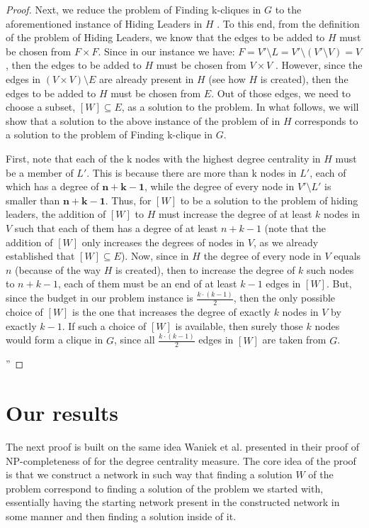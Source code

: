 \begin{proof}
{    Next, we reduce the problem of Finding k-cliques in $G$ to the aforementioned instance of Hiding
    Leaders in $H$ . To this end, from the definition of the problem of Hiding Leaders, we know that the
    edges to be added to $H$ must be chosen from $F \times F$. Since in our instance we have:
    $F = V' \setminus L = V' \setminus (V' \setminus V ) = V$, then the edges to be added to $H$ must be chosen
    from $V \times V$ . However, since the edges in $(V \times V ) \setminus E$ are already present in $H$
    (see how $H$ is created), then the edges to be added to $H$ must be chosen from $E$.
    Out of those edges, we need to choose a subset, $[W] \subseteq E$, as a solution to the problem.
    In what follows, we will show that a solution to the above instance of the problem of \HL in $H$ corresponds
    to a solution to the problem of Finding k-clique in $G$.

    First, note that each of the k nodes with the highest degree centrality in $H$ must be a member of
    $L'$. This is because there are more than k nodes in $L'$, each of which has a degree of $\boldsymbol{n+k-1}$, while
    the degree of every node in $V' \setminus L'$ is smaller than $\boldsymbol{n + k - 1}$. Thus, for $[W]$
    to be a solution to the problem of hiding leaders, the addition of $[W]$ to $H$ must increase
    the degree of at least $k$ nodes in $V$ such that each of them has a degree of at least $n + k - 1$
    (note that the addition of $[W]$ only increases the degrees of nodes in $V$, as we already established
    that $[W] \subseteq E$). Now, since in $H$ the degree of every node in $V$ equals $n$
    (because of the way $H$ is created), then to increase the degree of $k$ such nodes to $n + k - 1$, each of them
    must be an end of at least $k - 1$ edges in $[W]$. But, since the budget in our problem instance is
    $\frac{k\cdot(k-1)}{2}$, then the only possible choice of $[W]$ is the one that increases the
    degree of exactly $k$ nodes in $V$ by exactly $k - 1$. If such a choice of $[W]$ is available, then surely
    those $k$ nodes would form a clique in $G$, since all $\frac{k\cdot(k-1)}{2}$ edges in $[W]$ are taken from $G$.
    }''
\end{proof}


\section{Our results}

The next proof is built on the same idea Waniek et al. \cite{Waniek2017} presented in their proof of
NP-completeness of \HLshort for the degree centrality measure.
The core idea of the proof is that we construct a network in such way that finding a solution $W$ of the \HL problem
correspond to finding a solution of the problem we started with, essentially having the starting network
present in the constructed network in some manner and then finding a solution inside of it.

